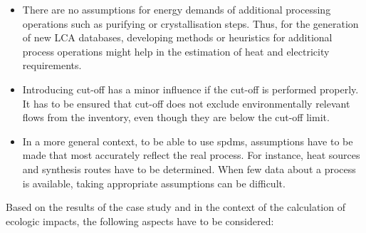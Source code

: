 \begin{itemize}
    \item There are no assumptions for energy demands of additional processing operations such as purifying or crystallisation steps. Thus, for the generation of new LCA databases, developing methods or heuristics for additional process operations might help in the estimation of heat and electricity requirements.
    \item Introducing cut-off has a minor influence if the cut-off is performed properly. It has to be ensured that cut-off does not exclude environmentally relevant flows from the inventory, even though they are below the cut-off limit.
    \item In a more general context, to be able to use \aclp{spdm}, assumptions have to be made that most accurately reflect the real process. For instance, heat sources and synthesis routes have to be determined. When few data about a process is available, taking appropriate assumptions can be difficult.
\end{itemize}



Based on the results of the case study and in the context of the calculation of ecologic impacts, the following aspects have to be considered:

